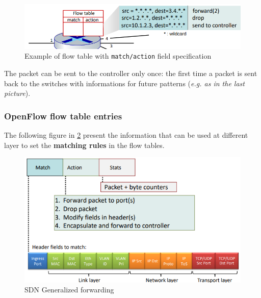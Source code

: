 \documentclass[10pt,a4paper]{report}
\theoremstyle{definition}
\begin{document}
\begin{figure}[h!]
	\centering\includegraphics[scale=0.50]{images/Pasted image 20230322114152.png}
	\caption{Example of flow table with \texttt{match/action} field specification}
	\label{header-fields}
\end{figure}
The packet can be sent to the controller only once: the first time a packet is sent back to the switches with informations for future patterns (\textit{e.g. as in the last picture}).
\subsubsection{OpenFlow flow table entries}\label{sec:openflow-flow-table-entries}
The following figure in \ref{openflow-entry} present the information that can be used at different layer to set the \textbf{matching rules} in the flow tables.
\begin{figure}[h]
	\centering\includegraphics[scale=0.50]{images/Pasted image 20230322114224.png}
	\caption{SDN Generalized forwarding}
	\label{openflow-entry}
\end{figure}
\end{document}
